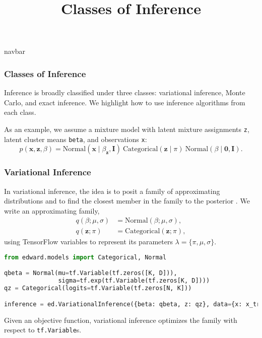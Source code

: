 \title{Classes of Inference}

{{navbar}}

\subsubsection{Classes of Inference}

Inference is broadly classified under three classes: variational
inference, Monte Carlo, and exact inference.
We highlight how to use inference algorithms from each class.

As an example, we assume a mixture model with latent mixture
assignments \texttt{z}, latent cluster means \texttt{beta}, and
observations \texttt{x}:
\begin{equation*}
p(\mathbf{x}, \mathbf{z}, \beta)
=
\text{Normal}(\mathbf{x} \mid \beta_{\mathbf{z}}, \mathbf{I})
~
\text{Categorical}(\mathbf{z}\mid \pi)
~
\text{Normal}(\beta\mid \mathbf{0}, \mathbf{I}).
\end{equation*}

\subsubsection{Variational Inference}

In variational inference, the idea is to posit a family of approximating
distributions and to find the closest member in the family to the
posterior \citep{jordan1999introduction}.
We write an approximating family,
\begin{align*}
q(\beta;\mu,\sigma) &= \text{Normal}(\beta; \mu,\sigma), \\[1.5ex]
q(\mathbf{z};\pi) &= \text{Categorical}(\mathbf{z};\pi),
\end{align*}
using TensorFlow variables to represent its parameters
$\lambda=\{\pi,\mu,\sigma\}$.
\begin{lstlisting}[language=Python]
from edward.models import Categorical, Normal

qbeta = Normal(mu=tf.Variable(tf.zeros([K, D])),
               sigma=tf.exp(tf.Variable(tf.zeros[K, D])))
qz = Categorical(logits=tf.Variable(tf.zeros[N, K]))

inference = ed.VariationalInference({beta: qbeta, z: qz}, data={x: x_train})
\end{lstlisting}
Given an objective function, variational inference optimizes the
family with respect to \texttt{tf.Variable}s.

